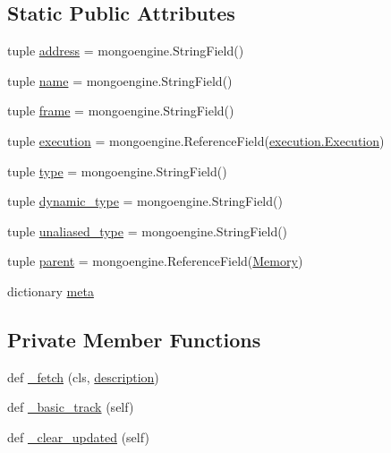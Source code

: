 \subsection*{Static Public Attributes}
\begin{DoxyCompactItemize}
\item 
tuple \hyperlink{classmemoryoracle_1_1instance_1_1Memory_a168ebce820209761e54c983c16bcd88f}{address} = mongoengine.\+String\+Field()
\item 
tuple \hyperlink{classmemoryoracle_1_1instance_1_1Memory_a00f51174e05bcbaa2d0ec3faccbaffaa}{name} = mongoengine.\+String\+Field()
\item 
tuple \hyperlink{classmemoryoracle_1_1instance_1_1Memory_afd58f13b2c1054f498e32b6643fbd82e}{frame} = mongoengine.\+String\+Field()
\item 
tuple \hyperlink{classmemoryoracle_1_1instance_1_1Memory_ad5fcccd559af49bd7a0ed2b25a08ec87}{execution} = mongoengine.\+Reference\+Field(\hyperlink{classmemoryoracle_1_1execution_1_1Execution}{execution.\+Execution})
\item 
tuple \hyperlink{classmemoryoracle_1_1instance_1_1Memory_a17b9f6c0f548bf201e4fc636c133470b}{type} = mongoengine.\+String\+Field()
\item 
tuple \hyperlink{classmemoryoracle_1_1instance_1_1Memory_a0e65734b42b7fbb648f644e3d40b039d}{dynamic\+\_\+type} = mongoengine.\+String\+Field()
\item 
tuple \hyperlink{classmemoryoracle_1_1instance_1_1Memory_abaa6ef3e2ff8451350f47b2c4795f5eb}{unaliased\+\_\+type} = mongoengine.\+String\+Field()
\item 
tuple \hyperlink{classmemoryoracle_1_1instance_1_1Memory_a4f97ee183fd07fc50a47cfef478700d8}{parent} = mongoengine.\+Reference\+Field(\textquotesingle{}\hyperlink{classmemoryoracle_1_1instance_1_1Memory}{Memory}\textquotesingle{})
\item 
dictionary \hyperlink{classmemoryoracle_1_1instance_1_1Memory_afebefc428546a963dbfab8ffcae72e8a}{meta}
\end{DoxyCompactItemize}
\subsection*{Private Member Functions}
\begin{DoxyCompactItemize}
\item 
def \hyperlink{classmemoryoracle_1_1instance_1_1Memory_ad3c1dc0d60db682e26c231eab85cb88b}{\+\_\+fetch} (cls, \hyperlink{classmemoryoracle_1_1tracked_1_1Tracked_abd8dc997fb5a226926f2044462dbd94b}{description})
\item 
def \hyperlink{classmemoryoracle_1_1instance_1_1Memory_ac50fd3bb7216dc0481b8c6f23831a998}{\+\_\+basic\+\_\+track} (self)
\item 
def \hyperlink{classmemoryoracle_1_1instance_1_1Memory_af30604c1bb14fe470d4086c10b08b45e}{\+\_\+clear\+\_\+updated} (self)
\end{DoxyCompactItemize}
